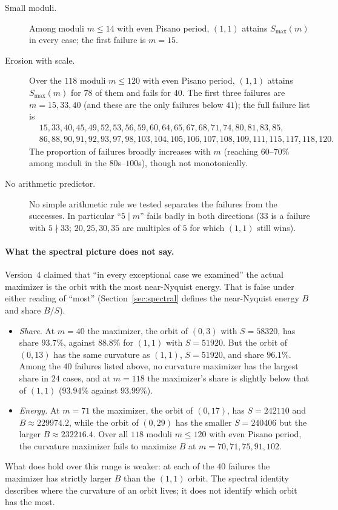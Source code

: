 \documentclass[12pt]{article}
\theoremstyle{remark}
\begin{document}
\begin{description}
\item[Small moduli.] Among moduli $m\le 14$ with even Pisano period, $(1,1)$ attains
$S_{\max}(m)$ in every case; the first failure is $m=15$.
\item[Erosion with scale.] Over the $118$ moduli $m\le 120$ with even Pisano period,
$(1,1)$ attains $S_{\max}(m)$ for $78$ of them and fails for $40$. The first three failures
are $m=15,33,40$ (and these are the only failures below $41$); the full failure list is
\[
\begin{aligned}
&15,33,40,45,49,52,53,56,59,60,64,65,67,68,71,74,80,81,83,85,\\
&86,88,90,91,92,93,97,98,103,104,105,106,107,108,109,111,115,117,118,120 .
\end{aligned}
\]
The proportion of failures broadly increases with $m$ (reaching $60$--$70\%$ among moduli
in the $80$s--$100$s), though not monotonically.
\item[No arithmetic predictor.] No simple arithmetic rule we tested separates the failures
from the successes. In particular ``$5\mid m$'' fails badly in both directions ($33$ is a
failure with $5\nmid 33$; $20,25,30,35$ are multiples of $5$ for which $(1,1)$ still wins).
\end{description}

\paragraph{What the spectral picture does not say.} Version~4 claimed that ``in every
exceptional case we examined'' the actual maximizer is the orbit with the most near-Nyquist
energy.
That is false under either reading of ``most'' (Section~\ref{sec:spectral} defines the
near-Nyquist energy $B$ and share $B/S$).
\begin{itemize}
\item \emph{Share.} At $m=40$ the maximizer, the orbit of $(0,3)$ with $S=58320$, has
share $93.7\%$, against $88.8\%$ for $(1,1)$ with $S=51920$. But the orbit of $(0,13)$ has
the same curvature as $(1,1)$, $S=51920$, and share $96.1\%$. Among the $40$ failures
listed above, no curvature maximizer has the largest share in $24$ cases, and at $m=118$
the maximizer's share is slightly below that of $(1,1)$ ($93.94\%$ against $93.99\%$).
\item \emph{Energy.} At $m=71$ the maximizer, the orbit of $(0,17)$, has $S=242110$ and
$B\approx 229974.2$, while the orbit of $(0,29)$ has the smaller $S=240406$ but the
larger $B\approx 232216.4$. Over all $118$ moduli $m\le 120$ with even Pisano period, the
curvature maximizer fails to maximize $B$ at $m=70,71,75,91,102$.
\end{itemize}
What does hold over this range is weaker: at each of the $40$ failures the maximizer has
strictly larger $B$ than the $(1,1)$ orbit. The spectral identity describes where the
curvature of an orbit lives; it does not identify which orbit has the most.
\end{document}
